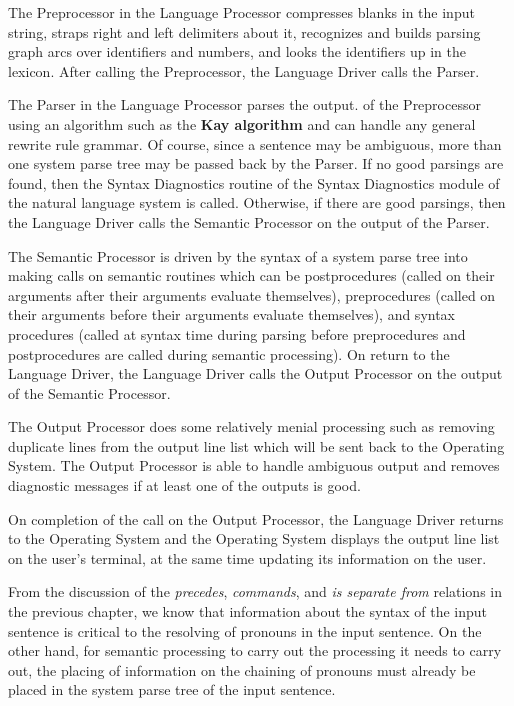 \documentclass{article}
\begin{document}
The Preprocessor in the Language Processor compresses blanks in
the input string, straps right and left delimiters about it,
recognizes and builds parsing graph arcs over identifiers and
numbers, and looks the identifiers up in the lexicon. After
calling the Preprocessor, the
Language Driver calls the Parser.

The Parser in the Language Processor parses the output.  of the
Preprocessor using an algorithm such as the
\textbf{Kay algorithm} and can handle any general rewrite rule
grammar.  Of course, since a sentence may be ambiguous, more
than one system parse tree may be passed back by the Parser. If
no good parsings are found, then the Syntax Diagnostics routine
of the Syntax Diagnostics module of the natural language system
is called. Otherwise, if there are good parsings, then the
Language Driver calls the Semantic Processor on the output of
the Parser.

The Semantic Processor is driven by the syntax of a system parse
tree into making calls on semantic routines which can be
postprocedures (called on their arguments after their arguments
evaluate themselves), preprocedures (called on their arguments
before their arguments evaluate themselves), and syntax
procedures (called at syntax time during parsing before
preprocedures and postprocedures are called during semantic
processing). On return to the Language Driver, the Language
Driver calls the Output Processor on the output of the Semantic
Processor.

The Output Processor does some relatively menial processing such
as removing duplicate lines from the output line list which will
be sent back to the Operating System.  The Output Processor is
able to handle ambiguous output and removes diagnostic messages
if at least one of the outputs is good.

On completion of the call on the Output Processor, the Language
Driver returns to the Operating System and the Operating System
displays the output line list on the user's terminal, at the
same time updating its information on the user.

From the discussion of the \textit{precedes}, \textit{commands},
and \textit{is separate from} relations in the previous chapter,
we know that information about the syntax of the input sentence
is critical to the resolving of pronouns in the input sentence.
On the other hand, for semantic processing to carry out the
processing it needs to carry out, the placing of information on
the chaining of pronouns must already be placed in the system
parse tree of the input sentence.
\end{document}
